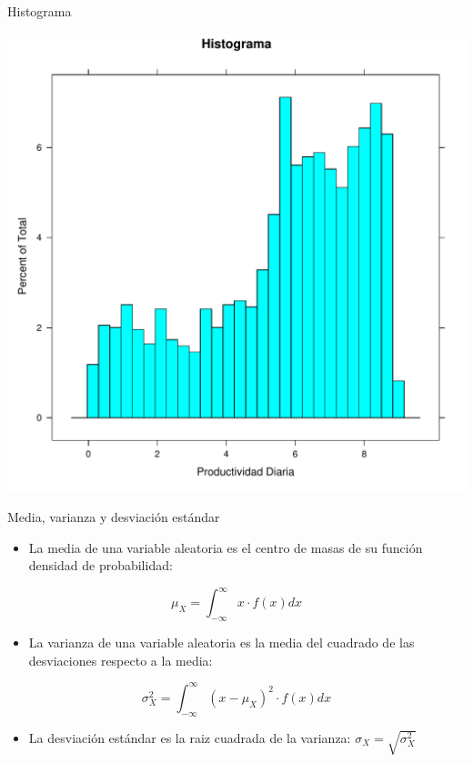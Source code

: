\documentclass[xcolor={usenames,svgnames,dvipsnames}]{beamer}
\begin{document}
\begin{frame}[label={sec:org3c9c07b}]{Histograma}
\begin{center}
\includegraphics[width=.9\linewidth]{../figs/Histograma.pdf}
\end{center}
\end{frame}



\begin{frame}[label={sec:orgcfb4e71}]{Media, varianza y desviación estándar}
\begin{itemize}
\item La \alert{media} de una variable aleatoria es el \alert{centro de masas} de su función densidad de probabilidad:
\end{itemize}

\[
\mu_{X}=\int_{-\infty}^{\infty}x\cdot f(x)dx
\]

\begin{itemize}
\item La \alert{varianza} de una variable aleatoria es la \alert{media del cuadrado de las desviaciones} respecto a la media:
\end{itemize}

\[
\sigma_{X}^{2}=\int_{-\infty}^{\infty}(x-\mu_{X})^{2}\cdot f(x)dx
\]

\begin{itemize}
\item La \alert{desviación estándar} es la raiz cuadrada de la varianza: \(\sigma_{X}=\sqrt{\sigma_{X}^2}\)
\end{itemize}
\end{frame}
\end{document}
